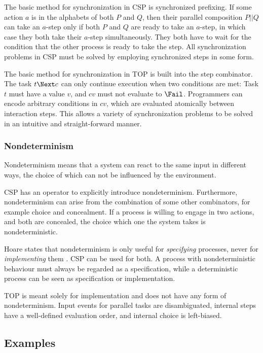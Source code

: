 The basic method for synchronization in CSP is synchronized prefixing.
If some action $a$ is in the alphabets of both $P$ and $Q$, then their parallel composition $P||Q$ can take an $a$-step only if both $P$ and $Q$ are ready to take an $a$-step, in which case they both take their $a$-step simultaneously.
They both have to wait for the condition that the other process is ready to take the step.
All synchronization problems in CSP must be solved by employing synchronized steps in some form.

The basic method for synchronization in TOP is built into the step combinator.
The task $t \Next c$ can only continue execution when two conditions are met:
Task $t$ must have a value $v$, and $cv$ must not evaluate to $\Fail$.
Programmers can encode arbitrary conditions in $cv$, which are evaluated atomically between interaction steps.
This allows a variety of synchronization problems to be solved in an intuitive and straight-forward manner.


\subsubsection{Nondeterminism}

Nondeterminism means that a system can react to the same input in different ways, the choice of which can not be influenced by the environment.

CSP has an operator to explicitly introduce nondeterminism.
Furthermore, nondeterminism can arise from the combination of some other combinators, for example choice and concealment.
If a process is willing to engage in two actions, and both are concealed, the choice which one the system takes is nondeterministic.

Hoare states that nondeterminism is only useful for \emph{specifying} processes, never for \emph{implementing} them \cite{books/Hoare85CSP}.
CSP can be used for both.
A process with nondeterministic behaviour must always be regarded as a specification, while a deterministic process can be seen as specification or implementation.

TOP is meant solely for implementation and does not have any form of nondeterminism.
Input events for parallel tasks are disambiguated, internal steps have a well-defined evaluation order, and internal choice is left-biased.


\subsection{Examples}

